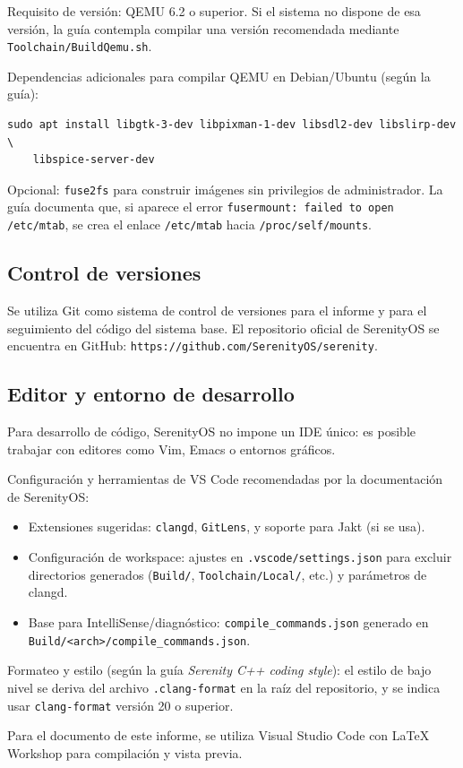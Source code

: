 Requisito de versión: QEMU 6.2 o superior. Si el sistema no dispone de esa versión, la guía contempla compilar una versión recomendada mediante \texttt{Toolchain/BuildQemu.sh}.

Dependencias adicionales para compilar QEMU en Debian/Ubuntu (según la guía):
\begin{verbatim}
sudo apt install libgtk-3-dev libpixman-1-dev libsdl2-dev libslirp-dev \
	libspice-server-dev
\end{verbatim}

Opcional: \texttt{fuse2fs} para construir imágenes sin privilegios de administrador. La guía documenta que, si aparece el error \texttt{fusermount: failed to open /etc/mtab}, se crea el enlace \texttt{/etc/mtab} hacia \texttt{/proc/self/mounts}.

\subsection{Control de versiones}
Se utiliza Git como sistema de control de versiones para el informe y para el seguimiento del código del sistema base. El repositorio oficial de SerenityOS se encuentra en GitHub: \texttt{https://github.com/SerenityOS/serenity}.

\subsection{Editor y entorno de desarrollo}
Para desarrollo de código, SerenityOS no impone un IDE único: es posible trabajar con editores como Vim, Emacs o entornos gráficos.

Configuración y herramientas de VS Code recomendadas por la documentación de SerenityOS:
\begin{itemize}
		\item Extensiones sugeridas: \texttt{clangd}, \texttt{GitLens}, y soporte para Jakt (si se usa).
		\item Configuración de workspace: ajustes en \texttt{.vscode/settings.json} para excluir directorios generados (\texttt{Build/}, \texttt{Toolchain/Local/}, etc.) y parámetros de clangd.
		\item Base para IntelliSense/diagnóstico: \texttt{compile\_commands.json} generado en \texttt{Build/<arch>/compile\_commands.json}.
\end{itemize}

Formateo y estilo (según la guía \textit{Serenity C++ coding style}): el estilo de bajo nivel se deriva del archivo \texttt{.clang-format} en la raíz del repositorio, y se indica usar \texttt{clang-format} versión 20 o superior.

Para el documento de este informe, se utiliza Visual Studio Code con LaTeX Workshop para compilación y vista previa.